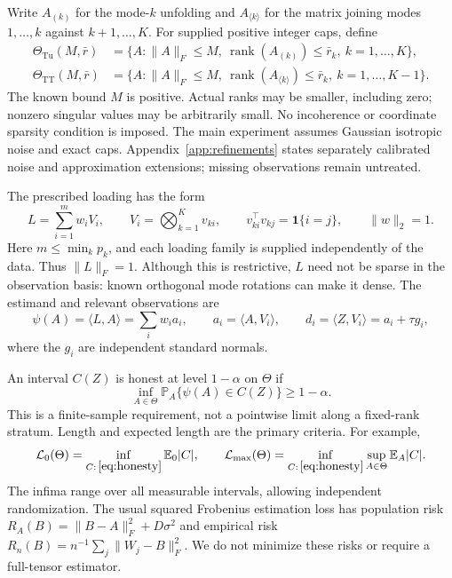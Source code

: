 \documentclass[11pt]{article}
\theoremstyle{remark}
\newcommand{\E}{\mathbb E}
\newcommand{\PP}{\mathbb P}
\newcommand{\ip}[2]{\langle #1,#2\rangle}
\newcommand{\norm}[1]{\lVert #1\rVert}
\newcommand{\rank}{\operatorname{rank}}
\newcommand{\Tu}{\mathrm{Tu}}
\newcommand{\TT}{\mathrm{TT}}
\newcommand{\calL}{\mathcal L}
\begin{document}
Write $A_{(k)}$ for the mode-$k$ unfolding and $A_{\langle k\rangle}$ for the matrix joining modes $1,\ldots,k$ against $k+1,\ldots,K$. For supplied positive integer caps, define
\begin{align}
 \Theta_{\Tu}(M,\bar r)&=\{A:\norm A_F\le M,\ \rank(A_{(k)})\le\bar r_k,\ k=1,\ldots,K\},\label{eq:tucker}\\
 \Theta_{\TT}(M,\bar r)&=\{A:\norm A_F\le M,\ \rank(A_{\langle k\rangle})\le\bar r_k,\ k=1,\ldots,K-1\}.\label{eq:tt}
\end{align}
The known bound $M$ is positive. Actual ranks may be smaller, including zero; nonzero singular values may be arbitrarily small. No incoherence or coordinate sparsity condition is imposed. The main experiment assumes Gaussian isotropic noise and exact caps. Appendix~\ref{app:refinements} states separately calibrated noise and approximation extensions; missing observations remain untreated.

The prescribed loading has the form
\begin{equation}\label{eq:loading}
 L=\sum_{i=1}^m w_i V_i,\qquad
 V_i=\bigotimes_{k=1}^K v_{ki},\qquad
 v_{ki}^\top v_{kj}=\mathbf1\{i=j\},\qquad \norm w_2=1.
\end{equation}
Here $m\le\min_k p_k$, and each loading family is supplied independently of the data. Thus $\norm L_F=1$. Although this is restrictive, $L$ need not be sparse in the observation basis: known orthogonal mode rotations can make it dense. The estimand and relevant observations are
\begin{equation}\label{eq:diagonal}
 \psi(A)=\ip LA=\sum_iw_i a_i,\qquad
 a_i=\ip A{V_i},\qquad d_i=\ip Z{V_i}=a_i+\tau g_i,
\end{equation}
where the $g_i$ are independent standard normals.

An interval $C(Z)$ is honest at level $1-\alpha$ on $\Theta$ if
\begin{equation}\label{eq:honesty}
 \inf_{A\in\Theta}\PP_A\{\psi(A)\in C(Z)\}\ge1-\alpha.
\end{equation}
This is a finite-sample requirement, not a pointwise limit along a fixed-rank stratum. Length and expected length are the primary criteria. For example,
\begin{equation}\label{eq:minimaxcriteria}
 \calL_0(\Theta)=\inf_{C:\,\eqref{eq:honesty}}\E_0|C|,
 \qquad \calL_{\max}(\Theta)=\inf_{C:\,\eqref{eq:honesty}}\sup_{A\in\Theta}\E_A|C|.
\end{equation}
The infima range over all measurable intervals, allowing independent randomization. The usual squared Frobenius estimation loss has population risk $R_A(B)=\norm{B-A}_F^2+D\sigma^2$ and empirical risk $R_n(B)=n^{-1}\sum_j\norm{W_j-B}_F^2$. We do not minimize these risks or require a full-tensor estimator.
\end{document}
